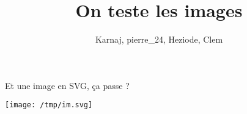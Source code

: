 \documentclass[small]{zmdocument}
\title{On teste les images}
\author{Karnaj, pierre\_24, Heziode, Clem}
\begin{document}
\maketitle
\tableofcontents

\levelOneIntroduction

Et une image en SVG, ça passe ?

\begin{center}
\texttt{[image: /tmp/im.svg]}
\end{center}
\end{document}
